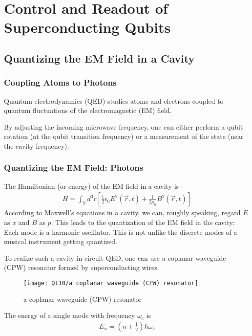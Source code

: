 \newpage
\section{Control and Readout of Superconducting Qubits}
\subsection{Quantizing the EM Field in a Cavity}

\subsubsection{Coupling Atoms to Photons}
Quantum electrodynamics (QED) studies atoms and electrons coupled to quantum fluctuations of the electromagnetic (EM) field.


By adjusting the incoming microwave frequency, one can either perform a qubit rotation (at the qubit transition frequency) or a measurement of the state (near the cavity frequency).

\subsubsection{Quantizing the EM Field: Photons}
The Hamiltonian (or energy) of the EM field in a cavity is
\begin{align*}
    H=\int_V d^3 r\left[ \frac{1}{2}\epsilon_0 E^2(\vec{r}, t)+\frac{1}{2\mu_0}B^2(\vec{r}, t) \right]
\end{align*}
According to Maxwell's equations in a cavity, we can, roughly speaking, regard $E$ as $x$ and $B$ as $p$. This leads to the quantization of the EM field in the cavity: Each mode is a harmonic oscillator. This is not unlike the discrete modes of a musical instrument getting quantized. 

To realize such a cavity in circuit QED, one can use a coplanar waveguide (CPW) resonator formed by superconducting wires.

\begin{figure}[!htb]
    \centering
    \texttt{[image: QI10/a coplanar waveguide (CPW) resonator]}
    \caption{a coplanar waveguide (CPW) resonator}
\end{figure}

The energy of a single mode with frequency $\omega_c$ is
\begin{align*}
    E_n=\left( n+\frac{1}{2} \right)\hbar\omega_c
\end{align*}

